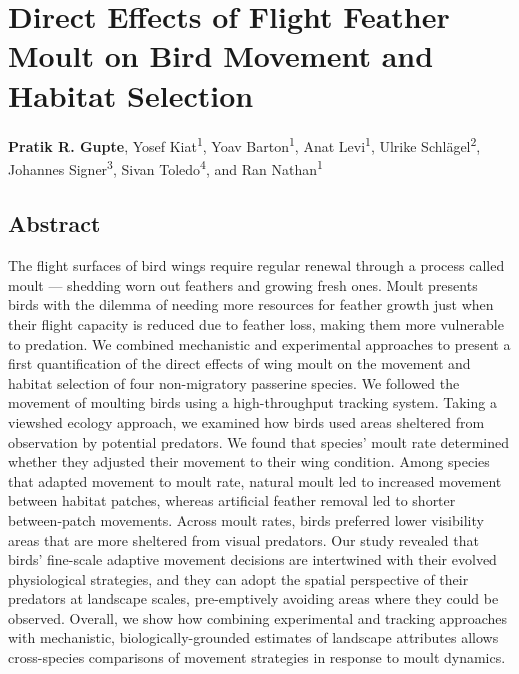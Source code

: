 \chapter{Direct Effects of Flight Feather Moult on Bird Movement and Habitat Selection}\label{ch:holeybirds}

{\noindent \textbf{Pratik R. Gupte}, Yosef Kiat\textsuperscript{1}, Yoav Barton\textsuperscript{1}, Anat Levi\textsuperscript{1}, Ulrike Schl{\"a}gel\textsuperscript{2}, Johannes Signer\textsuperscript{3}, Sivan Toledo\textsuperscript{4}, and Ran Nathan\textsuperscript{1}}


\section*{Abstract}

    The flight surfaces of bird wings require regular renewal through a process called moult --- shedding worn out feathers and growing fresh ones.
    Moult presents birds with the dilemma of needing more resources for feather growth just when their flight capacity is reduced due to feather loss, making them more vulnerable to predation.
    We combined mechanistic and experimental approaches to present a first quantification of the direct effects of wing moult on the movement and habitat selection of four non-migratory passerine species. 
    We followed the movement of moulting birds using a high-throughput tracking system. 
    Taking a viewshed ecology approach, we examined how birds used areas sheltered from observation by potential predators.
    We found that species' moult rate determined whether they adjusted their movement to their wing condition.
    Among species that adapted movement to moult rate, natural moult led to increased movement between habitat patches, whereas artificial feather removal led to shorter between-patch movements. 
    Across moult rates, birds preferred lower visibility areas that are more sheltered from visual predators.
    Our study revealed that birds' fine-scale adaptive movement decisions are intertwined with their evolved physiological strategies, and they can adopt the spatial perspective of their predators at landscape scales, pre-emptively avoiding areas where they could be observed.
    Overall, we show how combining experimental and tracking approaches with mechanistic, biologically-grounded estimates of landscape attributes allows cross-species comparisons of movement strategies in response to moult dynamics.


